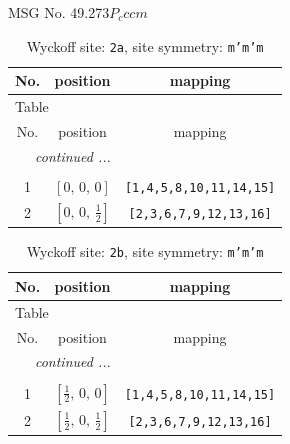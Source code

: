 \documentclass[fleqn,8pt]{jsarticle}
\begin{document}
\setcounter{MaxMatrixCols}{32}

\renewcommand{\tablename}{Table~}
\renewcommand{\figurename}{Figure~}
\begin{center}
\LARGE
MSG No. 49.273\quad$P_{c}ccm$
\end{center}
\renewcommand{\arraystretch}{1.2}
\begin{longtable}{ccc}
\caption{Wyckoff site: {\tt 2a}, site symmetry: {\tt m'm'm}}
 \\
 \hline \hline
No. & position & mapping \\ \hline \endfirsthead

\multicolumn{2}{l}{\tablename\ \thetable{}} \\
 \hline \hline
No. & position & mapping \\ \hline \endhead

 \hline \hline
\multicolumn{2}{r}{\footnotesize\it continued ...} \\ \endfoot

 \hline \hline
\multicolumn{2}{r}{} \\ \endlastfoot

1 & $\left[ 0,\, 0,\, 0 \right]$ & {\tt [1,4,5,8,10,11,14,15]} \\ \hline
2 & $\left[ 0,\, 0,\, \frac{1}{2} \right]$ & {\tt [2,3,6,7,9,12,13,16]} \\
\end{longtable}
\renewcommand{\arraystretch}{1.2}
\begin{longtable}{ccc}
\caption{Wyckoff site: {\tt 2b}, site symmetry: {\tt m'm'm}}
 \\
 \hline \hline
No. & position & mapping \\ \hline \endfirsthead

\multicolumn{2}{l}{\tablename\ \thetable{}} \\
 \hline \hline
No. & position & mapping \\ \hline \endhead

 \hline \hline
\multicolumn{2}{r}{\footnotesize\it continued ...} \\ \endfoot

 \hline \hline
\multicolumn{2}{r}{} \\ \endlastfoot

1 & $\left[ \frac{1}{2},\, 0,\, 0 \right]$ & {\tt [1,4,5,8,10,11,14,15]} \\ \hline
2 & $\left[ \frac{1}{2},\, 0,\, \frac{1}{2} \right]$ & {\tt [2,3,6,7,9,12,13,16]} \\
\end{longtable}
\end{document}
